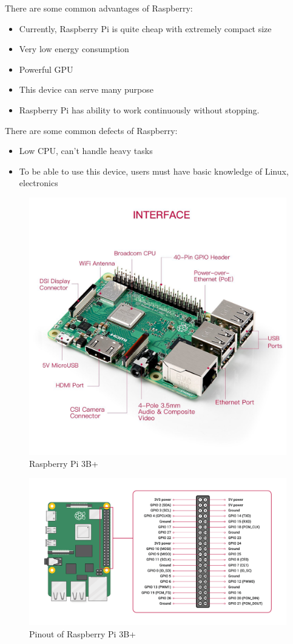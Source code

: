         There are some common advantages of Raspberry:
        \begin{itemize}
            \item Currently, Raspberry Pi is quite cheap with extremely compact size
            \item Very low energy consumption
            \item Powerful GPU
            \item This device can serve many purpose 
            \item Raspberry Pi has ability to work continuously without stopping.
        \end{itemize}
        There are some common defects of Raspberry:
        \begin{itemize}
            \item Low CPU, can't handle heavy tasks
            \item To be able to use this device, users must have basic knowledge of Linux, electronics
        \end{itemize}
        \begin{figure}[H]
            \centering
            \includegraphics[width=0.6\linewidth]{img/Raspberry.jpg}
            \caption{Raspberry Pi 3B+}
        \end{figure}
        \begin{figure}[H]
            \centering
            \includegraphics[width=0.6\linewidth]{img/GPIO-Pinout-Diagram.png}
            \caption{Pinout of Raspberry Pi 3B+}
        \end{figure}
